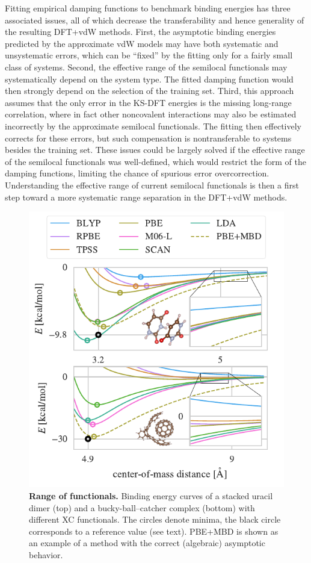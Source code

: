 Fitting empirical damping functions to benchmark binding energies has three associated issues, all of which decrease the transferability and hence generality of the resulting DFT+vdW methods.
First, the asymptotic binding energies predicted by the approximate vdW models may have both systematic and unsystematic errors, which can be ``fixed'' by the fitting only for a fairly small class of systems.
Second, the effective range of the semilocal functionals may systematically depend on the system type.
The fitted damping function would then strongly depend on the selection of the training set.
Third, this approach assumes that the only error in the KS-DFT energies is the missing long-range correlation, where in fact other noncovalent interactions may also be estimated incorrectly by the approximate semilocal functionals.
The fitting then effectively corrects for these errors, but such compensation is nontransferable to systems besides the training set.
These issues could be largely solved if the effective range of the semilocal functionals was well-defined, which would restrict the form of the damping functions, limiting the chance of spurious error overcorrection.
Understanding the effective range of current semilocal functionals is then a first step toward a more systematic range separation in the DFT+vdW methods.

\begin{figure}
\includegraphics[center]{../media/range-curves}
\caption{\textbf{Range of functionals.}
Binding energy curves of a stacked uracil dimer (top) and a bucky-ball--catcher complex (bottom) with different XC functionals.
The circles denote minima, the black circle corresponds to a reference value (see text).
PBE+MBD is shown as an example of a method with the correct (algebraic) asymptotic behavior.
}\label{fig:range}
\end{figure}

